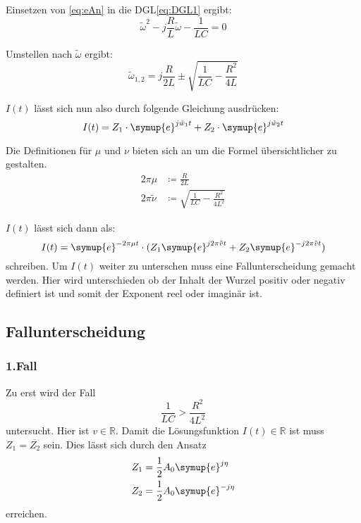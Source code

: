     \noindent Einsetzen von \ref{eq:eAn} in die DGL\ref{eq:DGL1} ergibt:
    \begin{equation}
        \tilde{\omega}^2 - j \frac{R}{L}\tilde{\omega} - \frac{1}{LC} = 0 \nonumber
    \end{equation}

    \noindent Umstellen nach $\tilde{\omega}$ ergibt:
    \begin{equation}
        \tilde{\omega}_{1,2} = j \frac{R}{2L} \pm \sqrt{\frac{1}{LC}-\frac{R^2}{4L}} \nonumber
    \end{equation}
    
    \noindent $I(t)$ lässt sich nun also durch folgende Gleichung ausdrücken:
    \begin{equation}
        I(t) = Z_1 \cdot \symup{e}^{j \tilde{w}_1t} + Z_2 \cdot \symup{e}^{j\tilde{w}_2 t} \nonumber
    \end{equation}
    
    \noindent Die Definitionen für $\mu$ und $\nu$ bieten sich an um die Formel übersichtlicher zu gestalten.
    \begin{align}
        2 \pi \mu & \coloneq \frac{R}{2L} \nonumber\\ 
        2 \pi \tilde{\nu} & \coloneq \sqrt{\frac{1}{LC} - \frac{R^2}{4L^2}} \nonumber
    \end{align}

    \noindent $I(t)$ lässt sich dann als:
    \begin{equation}
        I(t) = \symup{e}^{- 2 \pi \mu t} \cdot  (Z_1 \symup{e}^{j 2\pi \tilde{v}t} + Z_2 \symup{e}^{-j 2\pi \tilde{v} t}) \nonumber
    \end{equation}
    \noindent schreiben. Um $I(t)$ weiter zu unterschen muss eine Fallunterscheidung gemacht werden. Hier wird unterschieden ob der 
    Inhalt der Wurzel positiv oder negativ definiert ist und somit der Exponent reel oder imaginär ist. 
    \subsection{Fallunterscheidung}

        \subsubsection{1.Fall}
        Zu erst wird der Fall
        \begin{equation}
            \frac{1}{LC} > \frac{R^2}{4L^2}  \nonumber
        \end{equation}
        untersucht. Hier ist $v \in \mathds{R}$. Damit die Lösungsfunktion $I(t) \in \mathds{R}$ ist muss
        $Z_1 = \overline{Z_2}$ sein. Dies lässt sich durch den Ansatz
        \begin{align}
            Z_1 & = \frac{1}{2} A_0 \symup{e}^{j \eta } \nonumber\\
            Z_2 & = \frac{1}{2} A_0 \symup{e}^{-j \eta} \nonumber
        \end{align}
        erreichen.
        
